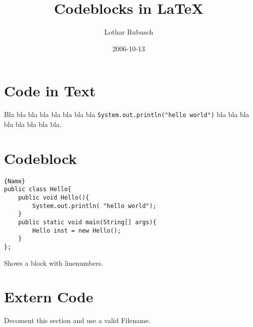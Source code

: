 \documentclass[a4paper,10pt]{scrartcl}
\title{Codeblocks in \LaTeX}
\author{Lothar Rubusch}
\date{2006-10-13}
\begin{document}
\maketitle

\section{Code in Text}
Bla bla bla bla bla bla bla bla \lstinline|System.out.println("hello world")| bla bla bla bla bla bla bla bla.
\newline

\section{Codeblock}
\begin{lstlisting}[caption=Example]{Name}
public class Hello{
	public void Hello(){
		System.out.println( "hello world");
	}
	public static void main(String[] args){
		Hello inst = new Hello();
	}
};
\end{lstlisting}
Shows a block with linenumbers.
\newline

\section{Extern Code}
Decoment this section and use a valid Filename.
%
\end{document}
